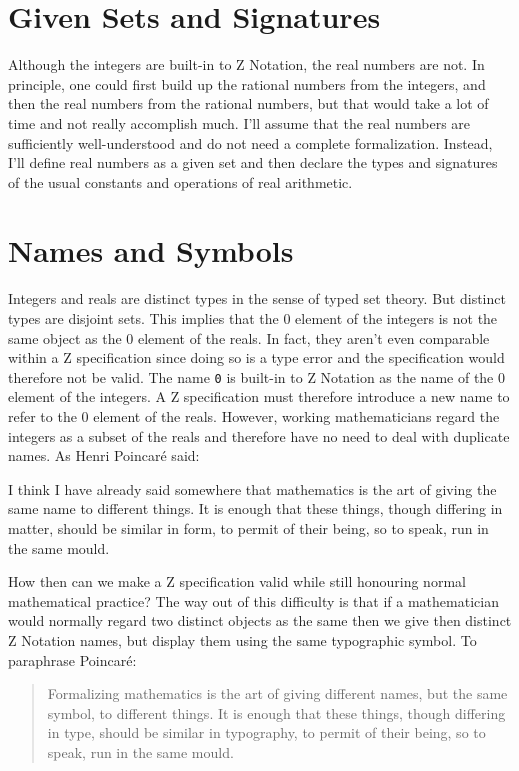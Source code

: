 \documentclass[11pt, oneside]{article}
\begin{document}
\section{Given Sets and Signatures}

Although the integers are built-in to Z Notation, the real numbers are not.
In principle, one could first build up the rational numbers from the integers,
and then the real numbers from the rational numbers, but that would take a lot of time and not really
accomplish much.
I'll assume that the real numbers are sufficiently well-understood and do not need a complete formalization.
Instead, I'll define real numbers as a given set and then declare the types and signatures of the usual constants and operations of real arithmetic.

\section{Names and Symbols}

Integers and reals are distinct types in the sense of typed set theory.
But distinct types are disjoint sets.
This implies that the $0$ element of the integers is not the same object as the $0$ element of the reals.
In fact, they aren't even comparable within a Z specification since doing so is a type error and the 
specification would therefore not be valid.
The name \texttt{0} is built-in to Z Notation as the name of the $0$ element of the integers.
A Z specification must therefore introduce a new name to refer to the $0$ element of the reals.
However, working mathematicians regard the integers as a subset of the reals and therefore have no need to deal with duplicate names.
As Henri Poincar\'{e} \cite{poincare-fm} said:
\begin{displayquote}
I think I have already said somewhere that mathematics is the art of giving the same name to different things. 
It is enough that these things, though differing in matter, should be similar in form, to permit of their being, so to speak, run in the same mould.\end{displayquote}

How then can we make a Z specification valid while still honouring normal mathematical practice?
The way out of this difficulty is that if a mathematician would normally regard two distinct objects as the same
then we give then distinct Z Notation names, but display them using the same typographic symbol.
To paraphrase Poincar\'{e}:
\begin{quote}
Formalizing mathematics is the art of giving different names, but the same symbol, to different things. 
It is enough that these things, though differing in type, should be similar in typography, 
to permit of their being, so to speak, run in the same mould.
\end{quote}
\end{document}
